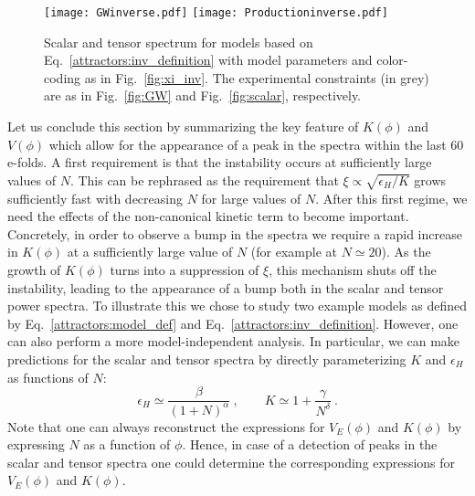 \begin{figure}[htb!]
%
\centering
\texttt{[image: GWinverse.pdf]}\vspace{5mm}
\texttt{[image: Productioninverse.pdf]}
%
\caption{Scalar and tensor spectrum for models based on Eq.~\eqref{attractors:inv_definition} with model parameters and color-coding as in Fig.~\ref{fig:xi_inv}.
 The experimental constraints (in grey) are as in Fig.~\ref{fig:GW} and Fig.~\ref{fig:scalar}, respectively.}
\label{fig:spectra}
%
\end{figure}



Let us conclude this section by summarizing the key feature of $K(\phi)$ and $V(\phi)$ which allow for the appearance of a peak in the spectra within the last 60 e-folds. A first requirement is that the instability occurs at sufficiently large values of $N$. This can be rephrased as the requirement that $\xi \propto \sqrt{\epsilon_H/K}$ grows sufficiently fast with decreasing $N$ for large values of $N$. After this first regime, we need the effects of the non-canonical kinetic term to become important. Concretely, in order to observe a bump in the spectra we require a rapid increase in $K(\phi)$ at a sufficiently large value of $N$ (for example at $N \simeq 20$). As the growth of $K(\phi)$ turns into a suppression of $\xi$, this mechanism shuts off the instability, leading to the appearance of a bump both in the scalar and tensor power spectra. To illustrate this we chose to study two example models as defined by Eq.~\eqref{attractors:model_def} and Eq.~\eqref{attractors:inv_definition}. However, one can also perform a more model-independent analysis. In particular, we can make predictions for the scalar and tensor spectra by directly parameterizing $K$ and $\epsilon_H$ as functions of $N$:
\begin{equation}
 	\epsilon_H \simeq \frac{\beta}{(1+N)^\alpha} \ , \qquad K \simeq 1 + \frac{\gamma}{N^\delta} \ .
 \end{equation} 
Note that one can always reconstruct the expressions for $V_E(\phi)$ and $K(\phi)$ by expressing $N$ as a function of $\phi$. Hence, in case of a detection of peaks in the scalar and tensor spectra one could determine the corresponding expressions for $V_E(\phi)$ and $K(\phi)$.